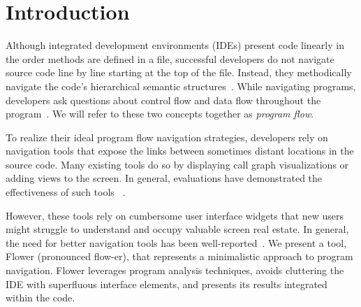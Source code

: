 \documentclass[conference]{IEEEtran}
\begin{document}



\IEEEpeerreviewmaketitle


\section{Introduction}
%

Although integrated development environments (IDEs) present code linearly in the order methods are defined in a file, successful developers do not navigate source code line by line starting at the top of the file. 
Instead, they methodically navigate the code's hierarchical semantic structures~\cite{robillard2004investigate}.
While navigating programs, developers ask questions about control flow and data flow throughout the program~\cite{latoza2010hard, Smith2015}. 
We will refer to these two concepts together as \textit{program flow}. 

To realize their ideal program flow navigation strategies, developers rely on navigation tools that expose the links between sometimes distant locations in the source code. 
Many existing tools do so by displaying call graph visualizations or adding views to the screen.
In general, evaluations have demonstrated the effectiveness of such tools ~\cite{Reacher,Whyline,Relo,Stacksplorer}.

However, these tools rely on cumbersome user interface widgets that new users might struggle to understand and occupy valuable screen real estate.
In general, the need for better navigation tools has been well-reported~\cite{ko2006seekInfo}.
We present a tool, Flower (pronounced flow-er), that represents a minimalistic approach to program navigation.
Flower  leverages program analysis techniques, avoids cluttering the IDE with superfluous interface elements, and presents its results integrated within the code.
\end{document}
